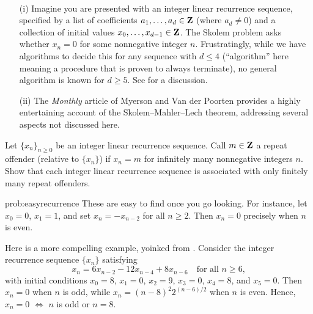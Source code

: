 \begin{rmks}\mbox{ }
\vspace{-0.12in}
\begin{enumerate}
\item[(i)] Imagine you are presented with an integer linear recurrence sequence, specified by a list of coefficients $a_1,\dots,a_d \in \mathbf{Z}$ (where $a_d \neq 0$) and a collection of initial values $x_0,\dots,x_{d-1} \in \mathbf{Z}$. The \textsf{Skolem problem} asks whether $x_n=0$ for some nonnegative integer $n$. Frustratingly, while we have algorithms to decide this for any sequence with $d\le 4$ (``algorithm'' here meaning a procedure that is proven to always terminate), no general algorithm is known for $d\ge 5$. See \cite{OW} for a discussion.
\item[(ii)] The \emph{Monthly} article \cite{MP} of Myerson and Van der Poorten provides a highly entertaining account of the Skolem--Mahler--Lech theorem, addressing several aspects not discussed here.
\end{enumerate}
\end{rmks}

\begin{challenge} Let $\{x_n\}_{n\ge 0}$ be an integer linear recurrence sequence. Call $m \in \mathbf{Z}$ a \textsf{repeat offender} (relative to $\{x_n\}$) if $x_n=m$ for infinitely many nonnegative integers $n$. Show that each integer linear recurrence sequence is associated with only finitely many repeat offenders.
\end{challenge}

\begin{sol}{prob:easyrecurrence}  These are easy to find once you go looking. For instance, let $x_0 = 0$, $x_1=1$, and set $x_{n} = -x_{n-2}$ for all $n\ge 2$. Then $x_n=0$ precisely when $n$ is even. 

Here is a more compelling example, yoinked from \cite{MP}. Consider the integer recurrence sequence $\{x_n\}$ satisfying 
\[ x_n = 6 x_{n-2} -12 x_{n-4} + 8 x_{n-6} \quad\text{for all $n\ge 6$}, \]
with initial conditions $x_0=8$, $x_1=0$, $x_2 = 9$, $x_3 = 0$, $x_4 = 8$, and $x_5=0$. Then $x_n = 0$ when $n$ is odd, while $x_n = (n-8)^2 2^{(n-6)/2}$ when $n$ is even. Hence, $x_n=0$ $\Longleftrightarrow$ $n$ is odd or $n=8$.
\end{sol}

